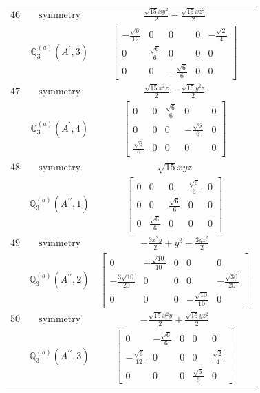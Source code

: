 \documentclass[fleqn,8pt,landscape]{jsarticle}
\begin{document}
\begin{longtable}{ccc}
$ 46 $ & $ \text{symmetry} $ & $ \frac{\sqrt{15} x y^{2}}{2} - \frac{\sqrt{15} x z^{2}}{2} $ \\
$  $ & $ \mathbb{Q}_{3}^{(a)}(A^{\prime},3) $ & $ \begin{bmatrix} - \frac{\sqrt{6}}{12} & 0 & 0 & 0 & - \frac{\sqrt{2}}{4} \\ 0 & \frac{\sqrt{6}}{6} & 0 & 0 & 0 \\ 0 & 0 & - \frac{\sqrt{6}}{6} & 0 & 0 \end{bmatrix} $ \\ \hline
$ 47 $ & $ \text{symmetry} $ & $ \frac{\sqrt{15} x^{2} z}{2} - \frac{\sqrt{15} y^{2} z}{2} $ \\
$  $ & $ \mathbb{Q}_{3}^{(a)}(A^{\prime},4) $ & $ \begin{bmatrix} 0 & 0 & \frac{\sqrt{6}}{6} & 0 & 0 \\ 0 & 0 & 0 & - \frac{\sqrt{6}}{6} & 0 \\ \frac{\sqrt{6}}{6} & 0 & 0 & 0 & 0 \end{bmatrix} $ \\ \hline
$ 48 $ & $ \text{symmetry} $ & $ \sqrt{15} x y z $ \\
$  $ & $ \mathbb{Q}_{3}^{(a)}(A^{\prime\prime},1) $ & $ \begin{bmatrix} 0 & 0 & 0 & \frac{\sqrt{6}}{6} & 0 \\ 0 & 0 & \frac{\sqrt{6}}{6} & 0 & 0 \\ 0 & \frac{\sqrt{6}}{6} & 0 & 0 & 0 \end{bmatrix} $ \\ \hline
$ 49 $ & $ \text{symmetry} $ & $ - \frac{3 x^{2} y}{2} + y^{3} - \frac{3 y z^{2}}{2} $ \\
$  $ & $ \mathbb{Q}_{3}^{(a)}(A^{\prime\prime},2) $ & $ \begin{bmatrix} 0 & - \frac{\sqrt{10}}{10} & 0 & 0 & 0 \\ - \frac{3 \sqrt{10}}{20} & 0 & 0 & 0 & - \frac{\sqrt{30}}{20} \\ 0 & 0 & 0 & - \frac{\sqrt{10}}{10} & 0 \end{bmatrix} $ \\ \hline
$ 50 $ & $ \text{symmetry} $ & $ - \frac{\sqrt{15} x^{2} y}{2} + \frac{\sqrt{15} y z^{2}}{2} $ \\
$  $ & $ \mathbb{Q}_{3}^{(a)}(A^{\prime\prime},3) $ & $ \begin{bmatrix} 0 & - \frac{\sqrt{6}}{6} & 0 & 0 & 0 \\ - \frac{\sqrt{6}}{12} & 0 & 0 & 0 & \frac{\sqrt{2}}{4} \\ 0 & 0 & 0 & \frac{\sqrt{6}}{6} & 0 \end{bmatrix} $ \\ \hline

\end{longtable}
\end{document}
